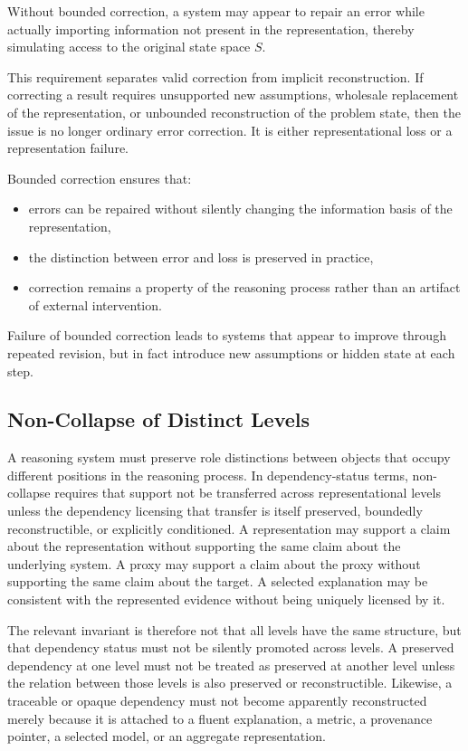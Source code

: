 \documentclass[11pt]{article}
\begin{document}
Without bounded correction, a system may appear to repair an error while actually importing information not present in the representation, thereby simulating access to the original state space $S$.

This requirement separates valid correction from implicit reconstruction. If correcting a result requires unsupported new assumptions, wholesale replacement of the representation, or unbounded reconstruction of the problem state, then the issue is no longer ordinary error correction. It is either representational loss or a representation failure.

Bounded correction ensures that:

\begin{itemize}[leftmargin=1.5em]
    \item errors can be repaired without silently changing the information basis of the representation,
    \item the distinction between error and loss is preserved in practice,
    \item correction remains a property of the reasoning process rather than an artifact of external intervention.
\end{itemize}

Failure of bounded correction leads to systems that appear to improve through repeated revision, but in fact introduce new assumptions or hidden state at each step.

\subsection{Non-Collapse of Distinct Levels}

A reasoning system must preserve role distinctions between objects that occupy different positions in the reasoning process. In dependency-status terms, non-collapse requires that support not be transferred across representational levels unless the dependency licensing that transfer is itself preserved, boundedly reconstructible, or explicitly conditioned. A representation may support a claim about the representation without supporting the same claim about the underlying system. A proxy may support a claim about the proxy without supporting the same claim about the target. A selected explanation may be consistent with the represented evidence without being uniquely licensed by it.

The relevant invariant is therefore not that all levels have the same structure, but that dependency status must not be silently promoted across levels. A preserved dependency at one level must not be treated as preserved at another level unless the relation between those levels is also preserved or reconstructible. Likewise, a traceable or opaque dependency must not become apparently reconstructed merely because it is attached to a fluent explanation, a metric, a provenance pointer, a selected model, or an aggregate representation.
\end{document}
